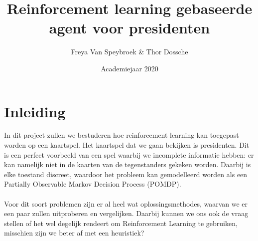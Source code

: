 \documentclass[11pt]{article}
\begin{document}
\begin{titlepage}
\title{Reinforcement learning gebaseerde agent voor presidenten}
\author{Freya Van Speybroek \& Thor Dossche}
\date{Academiejaar 2020 }
\maketitle
\thispagestyle{empty}
\end{titlepage}


\section{Inleiding}
In dit project zullen we bestuderen hoe reinforcement learning kan toegepast worden op een kaartspel. Het kaartspel dat we gaan bekijken is presidenten. Dit is een perfect voorbeeld van een spel waarbij we incomplete informatie hebben: er kan namelijk niet in de kaarten van de tegenstanders gekeken worden. Daarbij is elke toestand discreet, waardoor het probleem kan gemodelleerd worden als een Partially Observable Markov Decision Process (POMDP).\\\\
Voor dit soort problemen zijn er al heel wat oplossingsmethodes, waarvan we er een paar zullen uitproberen en vergelijken. Daarbij kunnen we ons ook de vraag stellen of het wel degelijk rendeert om Reinforcement Learning te gebruiken, misschien zijn we beter af met een heuristiek? \\
\end{document}
